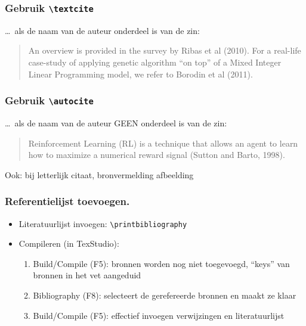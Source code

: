\documentclass[aspectratio=169]{beamer}
\begin{document}
\begin{frame}
  \frametitle{Gebruik \texttt{\textbackslash{}textcite}}

  \ldots\ als de naam van de auteur onderdeel is van de zin:

  \bigskip

  \begin{quotation}
    An overview is provided in the survey by Ribas et al (2010). For a real-life case-study of applying genetic algorithm ``on top'' of a Mixed Integer Linear Programming model, we refer to Borodin et al (2011).
  \end{quotation}

\end{frame}

\begin{frame}
  \frametitle{Gebruik \texttt{\textbackslash{}autocite}}

  \ldots\ als de naam van de auteur GEEN onderdeel is van de zin:

  \bigskip

  \begin{quotation}
    Reinforcement Learning (RL) is a technique that allows an agent to learn how to maximize a numerical reward signal (Sutton and Barto, 1998).
  \end{quotation}

  \bigskip
  
  Ook: bij letterlijk citaat, bronvermelding afbeelding

\end{frame}



\begin{frame}[fragile]
  \frametitle{Referentielijst toevoegen.}

  \begin{itemize}
    \item Literatuurlijst invoegen: \verb|\printbibliography|

    \item Compileren (in TexStudio):

    \begin{enumerate}
      \item Build/Compile (F5): bronnen worden nog niet toegevoegd, ``keys'' van bronnen in het vet aangeduid
      \item Bibliography (F8): selecteert de gerefereerde bronnen en maakt ze klaar
      \item Build/Compile (F5): effectief invoegen verwijzingen en literatuurlijst
    \end{enumerate}
  \end{itemize}
\end{frame}
\end{document}
